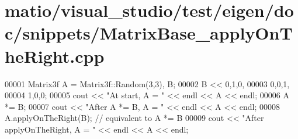 \hypertarget{matio_2visual__studio_2test_2eigen_2doc_2snippets_2_matrix_base__apply_on_the_right_8cpp_source}{}\section{matio/visual\+\_\+studio/test/eigen/doc/snippets/\+Matrix\+Base\+\_\+apply\+On\+The\+Right.cpp}
\label{matio_2visual__studio_2test_2eigen_2doc_2snippets_2_matrix_base__apply_on_the_right_8cpp_source}

\begin{DoxyCode}
00001 Matrix3f A = Matrix3f::Random(3,3), B;
00002 B << 0,1,0,  
00003      0,0,1,  
00004      1,0,0;
00005 cout << \textcolor{stringliteral}{"At start, A = "} << endl << A << endl;
00006 A *= B;
00007 cout << \textcolor{stringliteral}{"After A *= B, A = "} << endl << A << endl;
00008 A.applyOnTheRight(B);  \textcolor{comment}{// equivalent to A *= B}
00009 cout << \textcolor{stringliteral}{"After applyOnTheRight, A = "} << endl << A << endl;
\end{DoxyCode}
